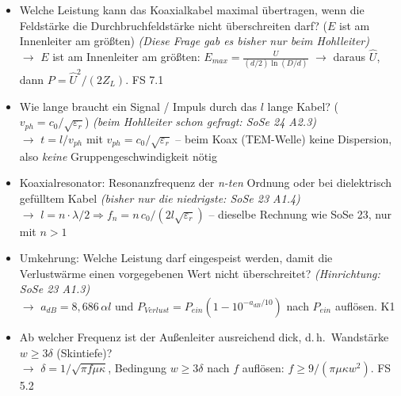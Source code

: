 \documentclass[a4paper,10pt]{article}
\begin{document}
\begin{tcolorbox}[colback=A1Farbe!4, colframe=A1Farbe!55, boxrule=0.5pt, arc=1mm, left=3mm, right=2mm, top=2mm, bottom=2mm, breakable, title={\sffamily\bfseries\small Was diesmal neu drankommen könnte \normalfont\itshape\footnotesize -- eigene Prognose (keine offizielle Ankündigung): Umkehrungen, Kombinationen und Transfers zwischen den Aufgabentypen}, coltitle=white, colbacktitle=A1Farbe!70]
\sffamily\small
\begin{itemize}\setlength{\itemsep}{2.2mm}\setlength{\leftmargini}{4mm}
\item Welche Leistung kann das Koaxialkabel maximal übertragen, wenn die Feldstärke die Durchbruchfeldstärke nicht überschreiten darf? ($E$ ist am Innenleiter am größten) \textcolor{Grau}{\itshape(Diese Frage gab es bisher nur beim Hohlleiter)}\\[0.6mm] {\footnotesize\color{A1Farbe}$\rightarrow$ $E$ ist am Innenleiter am größten: $E_{max}=\frac{U}{(d/2)\ln(D/d)}$ $\to$ daraus $\hat{U}$, dann $P=\hat{U}^2/(2Z_L)$. FS 7.1}
\item Wie lange braucht ein Signal / Impuls durch das $l$ lange Kabel? ($v_{ph}=c_0/\sqrt{\varepsilon_r}$) \textcolor{Grau}{\itshape(beim Hohlleiter schon gefragt: SoSe 24 A2.3)}\\[0.6mm] {\footnotesize\color{A1Farbe}$\rightarrow$ $t=l/v_{ph}$ mit $v_{ph}=c_0/\sqrt{\varepsilon_r}$ -- beim Koax (TEM-Welle) keine Dispersion, also \emph{keine} Gruppengeschwindigkeit nötig}
\item Koaxialresonator: Resonanzfrequenz der \emph{n-ten} Ordnung oder bei dielektrisch gefülltem Kabel \textcolor{Grau}{\itshape(bisher nur die niedrigste: SoSe 23 A1.4)}\\[0.6mm] {\footnotesize\color{A1Farbe}$\rightarrow$ $l=n\cdot\lambda/2 \Rightarrow f_n=n\,c_0/(2l\sqrt{\varepsilon_r})$ -- dieselbe Rechnung wie SoSe 23, nur mit $n>1$}
\item Umkehrung: Welche Leistung darf eingespeist werden, damit die Verlustwärme einen vorgegebenen Wert nicht überschreitet? \textcolor{Grau}{\itshape(Hinrichtung: SoSe 23 A1.3)}\\[0.6mm] {\footnotesize\color{A1Farbe}$\rightarrow$ $a_{dB}=8{,}686\,\alpha l$ und $P_{Verlust}=P_{ein}(1-10^{-a_{dB}/10})$ nach $P_{ein}$ auflösen. K1}
\item Ab welcher Frequenz ist der Außenleiter \glqq ausreichend dick\grqq, d.\,h.\ Wandstärke $w \ge 3\delta$ (Skintiefe)?\\[0.6mm] {\footnotesize\color{A1Farbe}$\rightarrow$ $\delta=1/\sqrt{\pi f\mu\kappa}$, Bedingung $w\ge 3\delta$ nach $f$ auflösen: $f\ge 9/(\pi\mu\kappa w^2)$. FS 5.2}

\end{itemize}
\end{tcolorbox}
\end{document}
